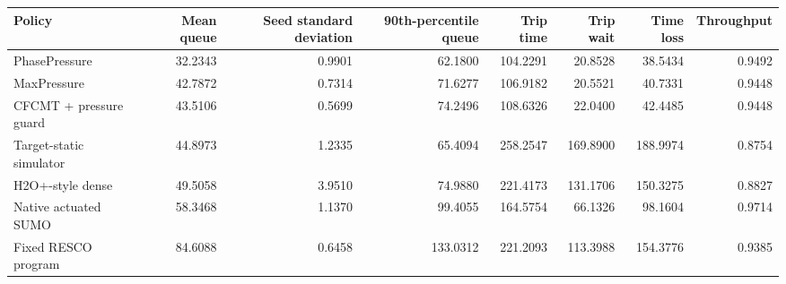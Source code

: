 \begin{tabular}{lrrrrrrr}
\toprule
Policy & Mean queue & Seed standard deviation & 90th-percentile queue & Trip time & Trip wait & Time loss & Throughput \\
\midrule
PhasePressure & 32.2343 & 0.9901 & 62.1800 & 104.2291 & 20.8528 & 38.5434 & 0.9492 \\
MaxPressure & 42.7872 & 0.7314 & 71.6277 & 106.9182 & 20.5521 & 40.7331 & 0.9448 \\
CFCMT + pressure guard & 43.5106 & 0.5699 & 74.2496 & 108.6326 & 22.0400 & 42.4485 & 0.9448 \\
Target-static simulator & 44.8973 & 1.2335 & 65.4094 & 258.2547 & 169.8900 & 188.9974 & 0.8754 \\
H2O+-style dense & 49.5058 & 3.9510 & 74.9880 & 221.4173 & 131.1706 & 150.3275 & 0.8827 \\
Native actuated SUMO & 58.3468 & 1.1370 & 99.4055 & 164.5754 & 66.1326 & 98.1604 & 0.9714 \\
Fixed RESCO program & 84.6088 & 0.6458 & 133.0312 & 221.2093 & 113.3988 & 154.3776 & 0.9385 \\
\bottomrule
\end{tabular}

